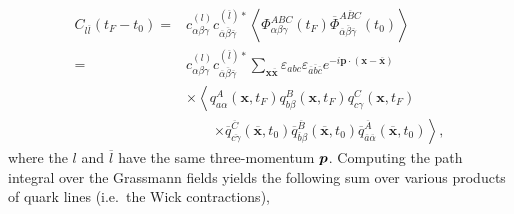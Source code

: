 \begin{equation}
    \begin{aligned}
    C_{l \overline{l}}\left(t_{F}-t_{0}\right)=&c_{\alpha \beta \gamma}^{(l)} c_{\overline{\alpha} \overline{\beta} \overline{\gamma}}^{(\overline{l}) *}\left\langle\Phi_{\alpha \beta \gamma}^{A B C}\left(t_{F}\right) \overline{\Phi}_{\overline{\alpha} \overline{\beta} \overline{\gamma}}^{\overline{A B C}}\left(t_{0}\right)\right\rangle \\
    =&c_{\alpha \beta \gamma}^{(l)} c_{\overline{\alpha} \overline{\beta} \overline{\gamma}}^{(\overline{l}) *} \sum_{\boldsymbol{x} \overline{\boldsymbol{x}}} \varepsilon_{a b c} \varepsilon_{\overline{a} \overline{b} \overline{c}} e^{-i \boldsymbol{p} \cdot(\boldsymbol{x}-\overline{\boldsymbol{x}})}\\
    &\times\left\langle q_{a \alpha}^{A}\left(\boldsymbol{x}, t_{F}\right) q_{b \beta}^{B}\left(\boldsymbol{x}, t_{F}\right) q_{c \gamma}^{C}\left(\boldsymbol{x}, t_{F}\right)\right.\\
    &\qquad\left.\times \overline{q}_{\overline{c \gamma}}^{\overline{C}}\left(\overline{\boldsymbol{x}}, t_{0}\right) \overline{q}_{\overline{b} \beta}^{\overline{B}}\left(\overline{\boldsymbol{x}}, t_{0}\right) \overline{q}_{\overline{a} \overline{\alpha}}^{\overline{A}}\left(\overline{\boldsymbol{x}}, t_{0}\right)\right\rangle,
    \end{aligned}
\end{equation}
where the $l$ and $\overline l$ have the same three-momentum $\boldsymbol{p}$. Computing the path integral over the Grassmann fields yields the following sum over various products of quark lines (i.e.\ the Wick contractions),
